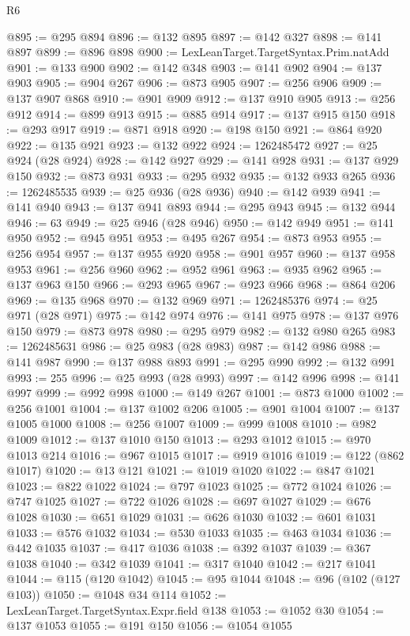 \begin{lexlean}{R6}
\begin{coremodule}
@895 := @295 @894
@896 := @132 @895
@897 := @142 @327
@898 := @141 @897
@899 := @896 @898
@900 := LexLeanTarget.TargetSyntax.Prim.natAdd
@901 := @133 @900
@902 := @142 @348
@903 := @141 @902
@904 := @137 @903
@905 := @904 @267
@906 := @873 @905
@907 := @256 @906
@909 := @137 @907 @868
@910 := @901 @909
@912 := @137 @910 @905
@913 := @256 @912
@914 := @899 @913
@915 := @885 @914
@917 := @137 @915 @150
@918 := @293 @917
@919 := @871 @918
@920 := @198 @150
@921 := @864 @920
@922 := @135 @921
@923 := @132 @922
@924 := 1262485472
@927 := @25 @924 (@28 @924)
@928 := @142 @927
@929 := @141 @928
@931 := @137 @929 @150
@932 := @873 @931
@933 := @295 @932
@935 := @132 @933 @265
@936 := 1262485535
@939 := @25 @936 (@28 @936)
@940 := @142 @939
@941 := @141 @940
@943 := @137 @941 @893
@944 := @295 @943
@945 := @132 @944
@946 := 63
@949 := @25 @946 (@28 @946)
@950 := @142 @949
@951 := @141 @950
@952 := @945 @951
@953 := @495 @267
@954 := @873 @953
@955 := @256 @954
@957 := @137 @955 @920
@958 := @901 @957
@960 := @137 @958 @953
@961 := @256 @960
@962 := @952 @961
@963 := @935 @962
@965 := @137 @963 @150
@966 := @293 @965
@967 := @923 @966
@968 := @864 @206
@969 := @135 @968
@970 := @132 @969
@971 := 1262485376
@974 := @25 @971 (@28 @971)
@975 := @142 @974
@976 := @141 @975
@978 := @137 @976 @150
@979 := @873 @978
@980 := @295 @979
@982 := @132 @980 @265
@983 := 1262485631
@986 := @25 @983 (@28 @983)
@987 := @142 @986
@988 := @141 @987
@990 := @137 @988 @893
@991 := @295 @990
@992 := @132 @991
@993 := 255
@996 := @25 @993 (@28 @993)
@997 := @142 @996
@998 := @141 @997
@999 := @992 @998
@1000 := @149 @267
@1001 := @873 @1000
@1002 := @256 @1001
@1004 := @137 @1002 @206
@1005 := @901 @1004
@1007 := @137 @1005 @1000
@1008 := @256 @1007
@1009 := @999 @1008
@1010 := @982 @1009
@1012 := @137 @1010 @150
@1013 := @293 @1012
@1015 := @970 @1013 @214
@1016 := @967 @1015
@1017 := @919 @1016
@1019 := @122 (@862 @1017)
@1020 := @13 @121
@1021 := @1019 @1020
@1022 := @847 @1021
@1023 := @822 @1022
@1024 := @797 @1023
@1025 := @772 @1024
@1026 := @747 @1025
@1027 := @722 @1026
@1028 := @697 @1027
@1029 := @676 @1028
@1030 := @651 @1029
@1031 := @626 @1030
@1032 := @601 @1031
@1033 := @576 @1032
@1034 := @530 @1033
@1035 := @463 @1034
@1036 := @442 @1035
@1037 := @417 @1036
@1038 := @392 @1037
@1039 := @367 @1038
@1040 := @342 @1039
@1041 := @317 @1040
@1042 := @217 @1041
@1044 := @115 (@120 @1042)
@1045 := @95 @1044
@1048 := @96 (@102 (@127 @103))
@1050 := @1048 @34 @114
@1052 := LexLeanTarget.TargetSyntax.Expr.field @138
@1053 := @1052 @30
@1054 := @137 @1053
@1055 := @191 @150
@1056 := @1054 @1055

\end{coremodule}
\end{lexlean}
